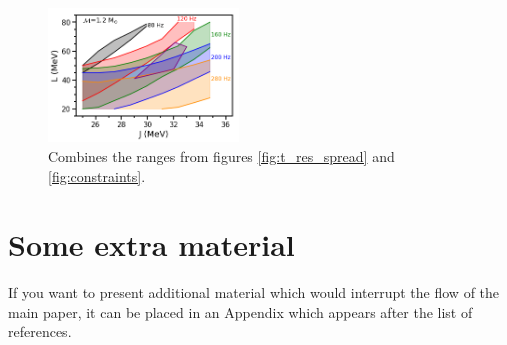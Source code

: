 \documentclass[fleqn,usenatbib]{mnras}
\begin{document}
\begin{figure}
\centering
\includegraphics[width=0.45\textwidth,angle=0]{JL_spread_due_to_Ksym_and_df_grid_280.png}
\caption{Combines the ranges from figures \ref{fig:t_res_spread} and \ref{fig:constraints}.}
\label{fig:all_constraints}
\end{figure}























\appendix

\section{Some extra material}

If you want to present additional material which would interrupt the flow of the main paper,
it can be placed in an Appendix which appears after the list of references.



\bsp	%
\label{lastpage}
\end{document}
